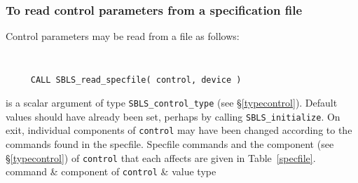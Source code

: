 \documentclass{galahad}
\newcommand{\packagename}{SBLS}
\begin{document}
\subsubsection{To read control parameters from a specification file}
\label{readspec}

Control parameters may be read from a file as follows:
\hskip0.5in 

\def\baselinestretch{0.8}
{\tt 
\begin{verbatim}
     CALL SBLS_read_specfile( control, device )
\end{verbatim}
}
\def\baselinestretch{1.0}

\begin{description}
 is a scalar \intentinout argument of type 
{\tt \packagename\_control\_type}
(see \S\ref{typecontrol}). 
Default values should have already been set, perhaps by calling 
{\tt \packagename\_initialize}.
On exit, individual components of {\tt control} may have been changed
according to the commands found in the specfile. Specfile commands and 
the component (see \S\ref{typecontrol}) of {\tt control} 
that each affects are given in Table~\ref{specfile}.
\hline
  command & component of {\tt control} & value type \\ 
\hline


\end{description}
\end{document}
